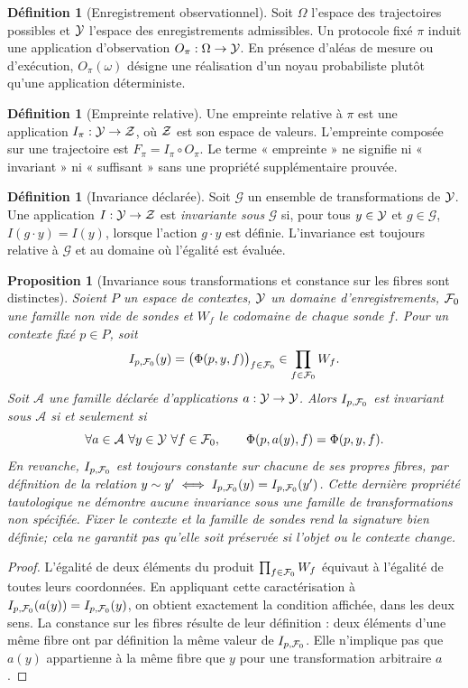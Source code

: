 \documentclass[11pt,oneside]{book}
\newtheorem{proposition}[theoreme]{Proposition}
\theoremstyle{definition}\newtheorem{definition}[theoreme]{Définition}\newtheorem{hypothese}[theoreme]{Hypothèse explicite}\newtheorem{convention}[theoreme]{Convention}\newtheorem{critere}[theoreme]{Critère}
\theoremstyle{remark}\newtheorem{remarque}[theoreme]{Remarque}\newtheorem{contreexemple}[theoreme]{Contre-exemple}
\begin{document}
\begin{definition}[Enregistrement observationnel]
Soit \(\Omega\) l'espace des trajectoires possibles et \(\mathcal Y\) l'espace des enregistrements admissibles. Un protocole fixé \(\pi\) induit une application d'observation \(O_\pi:\Omega\to\mathcal Y\). En présence d'aléas de mesure ou d'exécution, \(O_\pi(\omega)\) désigne une réalisation d'un noyau probabiliste plutôt qu'une application déterministe.
\end{definition}
\begin{definition}[Empreinte relative]
Une empreinte relative à \(\pi\) est une application \(I_\pi:\mathcal Y\to\mathcal Z\), où \(\mathcal Z\) est son espace de valeurs. L'empreinte composée sur une trajectoire est \(F_\pi=I_\pi\circ O_\pi\). Le terme « empreinte » ne signifie ni « invariant » ni « suffisant » sans une propriété supplémentaire prouvée.
\end{definition}
\begin{definition}[Invariance déclarée]
Soit \(\mathcal G\) un ensemble de transformations de \(\mathcal Y\). Une application \(I:\mathcal Y\to\mathcal Z\) est \emph{invariante sous} \(\mathcal G\) si, pour tous \(y\in\mathcal Y\) et \(g\in\mathcal G\), \(I(g\cdot y)=I(y)\), lorsque l'action \(g\cdot y\) est définie. L'invariance est toujours relative à \(\mathcal G\) et au domaine où l'égalité est évaluée.
\end{definition}
\begin{proposition}[Invariance sous transformations et constance sur les fibres sont distinctes]
Soient $P$ un espace de contextes, $\mathcal Y$ un domaine d'enregistrements, $\mathcal F_0$ une famille non vide de sondes et $W_f$ le codomaine de chaque sonde $f$. Pour un contexte fixé $p\in P$, soit
\[
 I_{p,\mathcal F_0}(y)=\bigl(\Phi(p,y,f)\bigr)_{f\in\mathcal F_0}\in\prod_{f\in\mathcal F_0}W_f.
\]
Soit $\mathcal A$ une famille déclarée d'applications $a:\mathcal Y\to\mathcal Y$. Alors $I_{p,\mathcal F_0}$ est invariant sous $\mathcal A$ si et seulement si
\[
 \forall a\in\mathcal A\ \forall y\in\Y\ \forall f\in\Fcal_0,\qquad
 \Phi(p,a(y),f)=\Phi(p,y,f).
\]
En revanche, $I_{p,\mathcal F_0}$ est toujours constante sur chacune de ses propres fibres, par définition de la relation $y\sim y'\iff I_{p,\mathcal F_0}(y)=I_{p,\mathcal F_0}(y')$. Cette dernière propriété tautologique ne démontre aucune invariance sous une famille de transformations non spécifiée. Fixer le contexte et la famille de sondes rend la signature bien définie; cela ne garantit pas qu'elle soit préservée si l'objet ou le contexte change.
\end{proposition}
\begin{proof}
L'égalité de deux éléments du produit $\prod_{f\in\mathcal F_0}W_f$ équivaut à l'égalité de toutes leurs coordonnées. En appliquant cette caractérisation à $I_{p,\mathcal F_0}(a(y))=I_{p,\mathcal F_0}(y)$, on obtient exactement la condition affichée, dans les deux sens. La constance sur les fibres résulte de leur définition : deux éléments d'une même fibre ont par définition la même valeur de $I_{p,\mathcal F_0}$. Elle n'implique pas que $a(y)$ appartienne à la même fibre que $y$ pour une transformation arbitraire $a$.
\end{proof}
\end{document}
